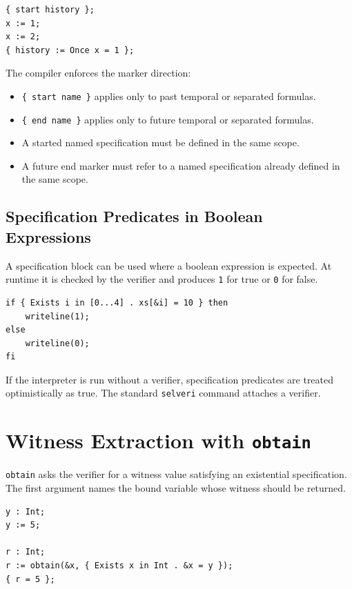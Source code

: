 \documentclass[11pt]{article}
\begin{document}
\begin{lstlisting}
{ start history };
x := 1;
x := 2;
{ history := Once x = 1 };
\end{lstlisting}

The compiler enforces the marker direction:

\begin{itemize}[nosep]
  \item \texttt{\{ start name \}} applies only to past temporal or separated formulas.
  \item \texttt{\{ end name \}} applies only to future temporal or separated formulas.
  \item A started named specification must be defined in the same scope.
  \item A future end marker must refer to a named specification already defined in the same scope.
\end{itemize}

\subsection{Specification Predicates in Boolean Expressions}

A specification block can be used where a boolean expression is expected. At runtime it is checked by the verifier and produces \texttt{1} for true or \texttt{0} for false.

\begin{lstlisting}
if { Exists i in [0...4] . xs[&i] = 10 } then
    writeline(1);
else
    writeline(0);
fi
\end{lstlisting}

If the interpreter is run without a verifier, specification predicates are treated optimistically as true. The standard \texttt{selveri} command attaches a verifier.

\section{Witness Extraction with \texttt{obtain}}

\texttt{obtain} asks the verifier for a witness value satisfying an existential specification. The first argument names the bound variable whose witness should be returned.

\begin{lstlisting}
y : Int;
y := 5;

r : Int;
r := obtain(&x, { Exists x in Int . &x = y });
{ r = 5 };
\end{lstlisting}
\end{document}
